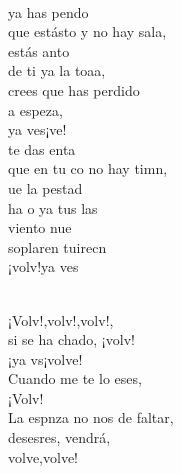\documentclass[12pt]{article}
\begin{document}
\begin{multicols*}{2}
\begin{cancion}%
	  \\
	ya has pendo\\
	que estásto y no hay sala,\\
	estás anto \\
	de ti ya la toaa,\\
	crees que  has perdido\\
	a  espeza,\\
	ya ves¡ve! \\
	te das enta\\
	que en tu co no hay timn,\\
	ue la pestad \\
	ha o ya tus las\\
	viento nue \\
	soplaren tuirecn \\
	¡volv!ya ves\\\jump\\
	\begin{chorus}%
	¡Volv!,volv!,volv!,     \\
	si se ha chado, ¡volv!\\
	¡ya vs¡volve!\\
	Cuando me te lo eses,\\
	¡Volv!\\
	La espnza no nos  de faltar,\\
	desesres, vendrá,\\
	volve,volve!\\

\end{chorus}
\end{cancion}
\end{multicols*}
\end{document}
